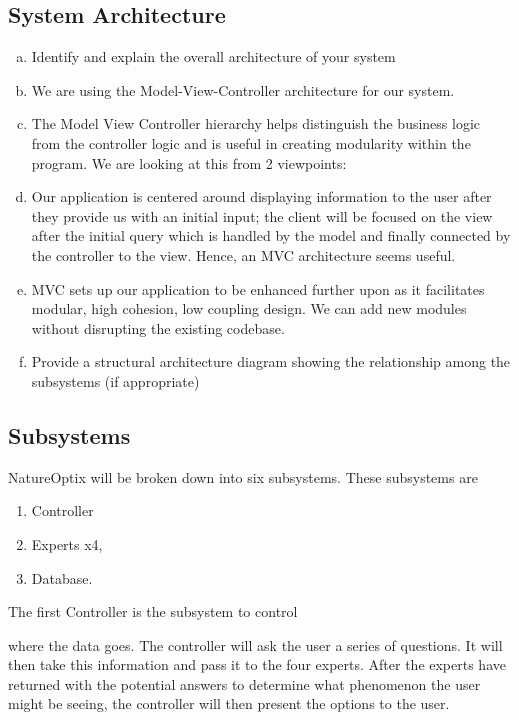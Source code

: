 \documentclass[]{article}
\begin{document}
\subsection{System Architecture}
\label{sub:system_architecture}
\begin{enumerate}[a)]
	\item Identify and explain the overall architecture of your system
	\item We are using the Model-View-Controller architecture for our system.
	\item The Model View Controller hierarchy helps distinguish the business logic from the controller logic and is useful in creating modularity within the program. We are looking at this from 2 viewpoints:
		\item Our application is centered around displaying information to the user after they provide us with an initial input; the client will be focused on the view after the initial query which is handled by the model and finally connected by the controller to the view. Hence, an MVC architecture seems useful.
		\item MVC sets up our application to be enhanced further upon as it facilitates modular, high cohesion, low coupling design. We can add new modules without disrupting the existing codebase.
	\item Provide a structural architecture diagram showing the relationship among the subsystems (if appropriate)
\end{enumerate}

\subsection{Subsystems}
\label{sub:subsystems}
NatureOptix will be broken down into six subsystems. These subsystems are
\begin{enumerate}
	\item Controller %
	\item Experts x4,
	\item Database.
\end{enumerate}
The first Controller is the subsystem to control where the data goes. The controller will ask the user a series of questions. It will then take this information and pass it to the four experts. After the experts have returned with the potential answers to determine what phenomenon the user might be seeing, the controller will then present the options to the user. 
\end{document}
